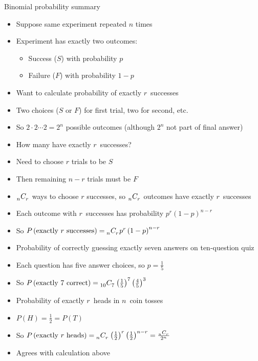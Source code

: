 \documentclass[handout,xcolor=dvipsnames]{beamer}
\theoremstyle{definition}
\newcommand\ncr[2]{\tensor[_{#1}]C{_{#2}}}
\begin{document}
\begin{frame}{Binomial probability summary}
\begin{itemize}
\item Suppose same experiment repeated $n$ times
\item Experiment has exactly two outcomes:
\begin{itemize}
\item Success ($S$) with probability $p$
\item Failure ($F$) with probability $1-p$
\end{itemize}
\item Want to calculate probability of exactly $r$~successes
\item Two choices ($S$ or $F$) for first trial, two for second, etc.
\item So $2\cdot 2\cdots 2=2^n$ possible outcomes (although $2^n$
not part of final answer)
\item How many have exactly $r$~successes?
\item Need to choose $r$ trials to be $S$
\item Then remaining $n-r$ trials must be $F$
\item $\ncr{n}{r}$ ways to choose $r$ successes,
so $\ncr{n}{r}$ outcomes have exactly $r$~successes
\item Each outcome with $r$~successes has probability
$p^r\left(1-p\right)^{n-r}$
\item So $P\left(\text{exactly $r$ successes}\right)
=\ncr{n}{r}p^r\left(1-p\right)^{n-r}$
\end{itemize}
\end{frame}

\begin{frame}
\begin{example}
\begin{itemize}
\item Probability of correctly guessing exactly seven answers
on ten-question quiz
\item Each question has five answer choices,
so $p=\frac{1}{5}$
\item So $P\left(\text{exactly $7$ correct}\right)
=\ncr{10}{7}\left(\frac{1}{5}\right)^7\left(\frac{4}{5}\right)^3$
\end{itemize}
\end{example}
\begin{example}
\begin{itemize}
\item Probability of exactly $r$~heads in $n$~coin tosses
\item $P\left(H\right)=\frac{1}{2}=P\left(T\right)$
\item So $P\left(\text{exactly $r$ heads}\right)
=\ncr{n}{r}\left(\frac{1}{2}\right)^r\left(\frac{1}{2}\right)^{n-r}
=\frac{\ncr{n}{r}}{2^n}$
\item Agrees with calculation above
\end{itemize}
\end{example}
\end{frame}
\end{document}
